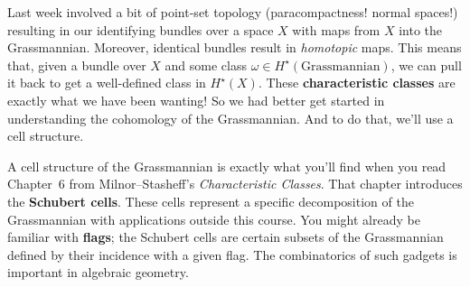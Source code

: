\documentclass{homework}
\author{Jim Fowler}
\date{Week 5: Cohomology of Grassmannian}
\begin{document}
\maketitle

Last week involved a bit of point-set topology (paracompactness!
normal spaces!) resulting in our identifying bundles over a space $X$
with maps from $X$ into the Grassmannian.  Moreover, identical bundles
result in \textit{homotopic} maps.  This means that, given a bundle
over $X$ and some class $\omega \in H^\star(\mbox{Grassmannian})$, we
can pull it back to get a well-defined class in $H^\star(X)$.  These
\textbf{characteristic classes} are exactly what we have been wanting!
So we had better get started in understanding the cohomology of the
Grassmannian.  And to do that, we'll use a cell structure.

A cell structure of the Grassmannian is exactly what you'll find when
you read Chapter~6 from Milnor--Stasheff's \textit{Characteristic
  Classes}.  That chapter introduces the \textbf{Schubert
  cells}. These cells represent a specific decomposition of the
Grassmannian with applications outside this course. You might already
be familiar with \textbf{flags}; the Schubert cells are certain
subsets of the Grassmannian defined by their incidence with a given
flag.  The combinatorics of such gadgets is important in algebraic
geometry.
\end{document}
